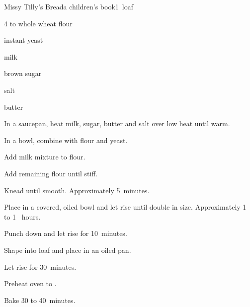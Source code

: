 \begin{recipe}{Missy Tilly's Bread}{a children's book}{1~loaf}

\begin{ingredients}
\item 4 to \C{4\third} whole wheat flour
\item \tp{4\half} instant yeast
\item \C{1\threequarter} milk
\item \C{\half} brown sugar
\item {} salt
\item {} butter
\end{ingredients}

\begin{directions}
\item In a saucepan, heat milk, sugar, butter and salt over low heat until warm.
\item In a bowl, combine with  flour and yeast.
\item Add milk mixture to flour.
\item Add remaining flour until stiff.
\item Knead until smooth. Approximately 5~minutes.
\item Place in a covered, oiled bowl and let rise until double in size. Approximately 1 to 1 \half~hours.
\item Punch down and let rise for 10~minutes.
\item Shape into loaf and place in an oiled pan.
\item Let rise for 30~minutes.
\item Preheat oven to .
\item Bake 30 to 40~minutes.
\end{directions}
\end{recipe}

